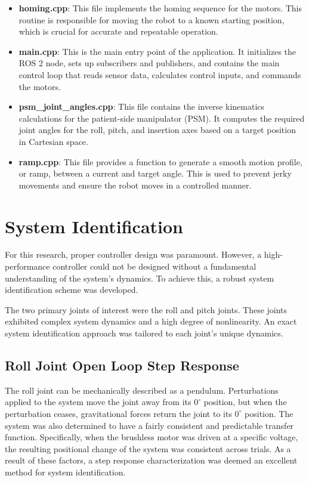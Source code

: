 \begin{itemize}
    \item \textbf{homing.cpp}: This file implements the homing sequence for the motors. This routine is responsible for moving the robot to a known starting position, which is crucial for accurate and repeatable operation.
    \item \textbf{main.cpp}: This is the main entry point of the application. It initializes the ROS 2 node, sets up subscribers and publishers, and contains the main control loop that reads sensor data, calculates control inputs, and commands the motors.
    \item \textbf{psm\_joint\_angles.cpp}: This file contains the inverse kinematics calculations for the patient-side manipulator (PSM). It computes the required joint angles for the roll, pitch, and insertion axes based on a target position in Cartesian space.
    \item \textbf{ramp.cpp}: This file provides a function to generate a smooth motion profile, or ramp, between a current and target angle. This is used to prevent jerky movements and ensure the robot moves in a controlled manner.
\end{itemize}

\section{System Identification}

For this research, proper controller design was paramount. However, a high-performance controller could not be designed without a fundamental understanding of the system's dynamics. To achieve this, a robust system identification scheme was developed.

The two primary joints of interest were the roll and pitch joints. These joints exhibited complex system dynamics and a high degree of nonlinearity. An exact system identification approach was tailored to each joint's unique dynamics.

\subsection{Roll Joint Open Loop Step Response}

The roll joint can be mechanically described as a pendulum. Perturbations applied to the system move the joint away from its $0^\circ$ position, but when the perturbation ceases, gravitational forces return the joint to its $0^\circ$ position. The system was also determined to have a fairly consistent and predictable transfer function. Specifically, when the brushless motor was driven at a specific voltage, the resulting positional change of the system was consistent across trials. As a result of these factors, a step response characterization was deemed an excellent method for system identification.


